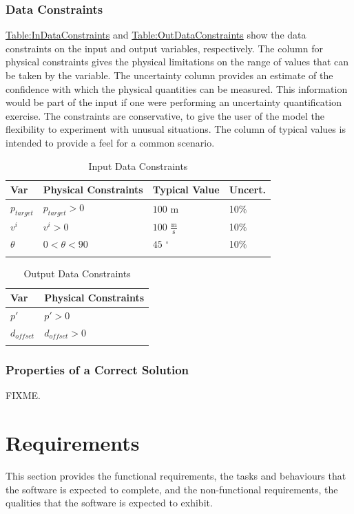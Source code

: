\documentclass[12pt]{article}
\begin{document}
\subsubsection{Data Constraints}
\label{Sec:DataConstraints}
\hyperref[Table:InDataConstraints]{Table:InDataConstraints} and \hyperref[Table:OutDataConstraints]{Table:OutDataConstraints} show the data constraints on the input and output variables, respectively. The column for physical constraints gives the physical limitations on the range of values that can be taken by the variable. The uncertainty column provides an estimate of the confidence with which the physical quantities can be measured. This information would be part of the input if one were performing an uncertainty quantification exercise. The constraints are conservative, to give the user of the model the flexibility to experiment with unusual situations. The column of typical values is intended to provide a feel for a common scenario.
\begin{longtable}{l l l l}
\toprule
Var & Physical Constraints & Typical Value & Uncert.
\\
\midrule
\endhead
${p_{target}}$ & ${p_{target}}>0$ & $100$ m & 10$\%$
\\
${v^{i}}$ & ${v^{i}}>0$ & $100$ $\frac{\text{m}}{\text{s}}$ & 10$\%$
\\
$θ$ & $0<θ<90$ & $45$ ${}^{\circ}$ & 10$\%$
\\
\bottomrule
\caption{Input Data Constraints}
\label{Table:InDataConstraints}
\end{longtable}
\begin{longtable}{l l}
\toprule
Var & Physical Constraints
\\
\midrule
\endhead
$p'$ & $p'>0$
\\
${d_{offset}}$ & ${d_{offset}}>0$
\\
\bottomrule
\caption{Output Data Constraints}
\label{Table:OutDataConstraints}
\end{longtable}
\subsubsection{Properties of a Correct Solution}
\label{Sec:CorSolProps}
FIXME.
\section{Requirements}
\label{Sec:Requirements}
This section provides the functional requirements, the tasks and behaviours that the software is expected to complete, and the non-functional requirements, the qualities that the software is expected to exhibit.
\end{document}
